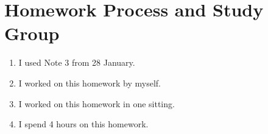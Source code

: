 \documentclass[]{article}
\begin{document}

\section{Homework Process and Study Group}

\renewcommand{\theenumi}{\alph{enumi}}
\begin{enumerate}
	\item I used Note 3 from 28 January.
	\item I worked on this homework by myself.
	\item I worked on this homework in one sitting.
	\item I spend 4 hours on this homework.
\end{enumerate}

\newpage

%
\end{document}
